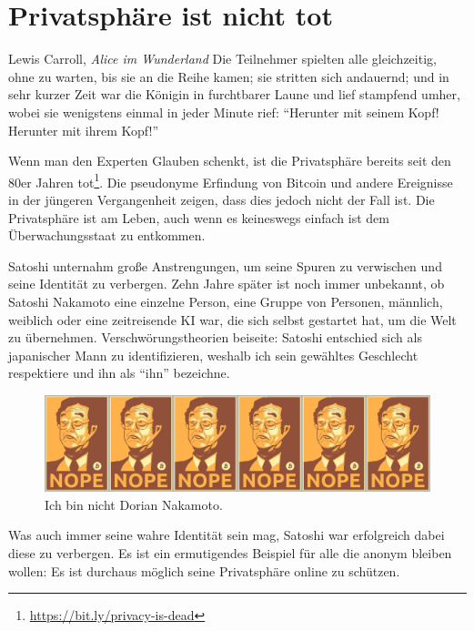 \chapter{Privatsphäre ist nicht tot}
\label{les:19}

\begin{chapquote}{Lewis Carroll, \textit{Alice im Wunderland}}
Die Teilnehmer spielten alle gleichzeitig, ohne zu warten, bis sie an die Reihe
kamen; sie stritten sich andauernd; und in sehr kurzer Zeit war die Königin in
furchtbarer Laune und lief stampfend umher, wobei sie wenigstens einmal in jeder
Minute rief: \enquote{Herunter mit seinem Kopf! Herunter mit ihrem Kopf!}
\end{chapquote}

Wenn man den Experten Glauben schenkt, ist die Privatsphäre bereits seit den 80er
Jahren tot\footnote{\url{https://bit.ly/privacy-is-dead}}. Die pseudonyme
Erfindung von Bitcoin und andere Ereignisse in der jüngeren Vergangenheit zeigen,
dass dies jedoch nicht der Fall ist. Die Privatsphäre ist am Leben, auch wenn es
keineswegs einfach ist dem Überwachungsstaat zu entkommen.

Satoshi unternahm große Anstrengungen, um seine Spuren zu verwischen und seine
Identität zu verbergen. Zehn Jahre später ist noch immer unbekannt, ob Satoshi
Nakamoto eine einzelne Person, eine Gruppe von Personen, männlich, weiblich oder
eine zeitreisende KI war, die sich selbst gestartet hat, um die Welt zu
übernehmen. Verschwörungstheorien beiseite: Satoshi entschied sich als
japanischer Mann zu identifizieren, weshalb ich sein gewähltes Geschlecht
respektiere und ihn als \enquote{ihn} bezeichne.

\begin{figure}
  \includegraphics[width=\textwidth]{assets/images/nope.png}
  \caption{Ich bin nicht Dorian Nakamoto.}
  \label{fig:nope}
\end{figure}

\newpage

Was auch immer seine wahre Identität sein mag, Satoshi war erfolgreich dabei
diese zu verbergen. Es ist ein ermutigendes Beispiel für alle die anonym bleiben
wollen: Es ist durchaus möglich seine Privatsphäre online zu schützen.


